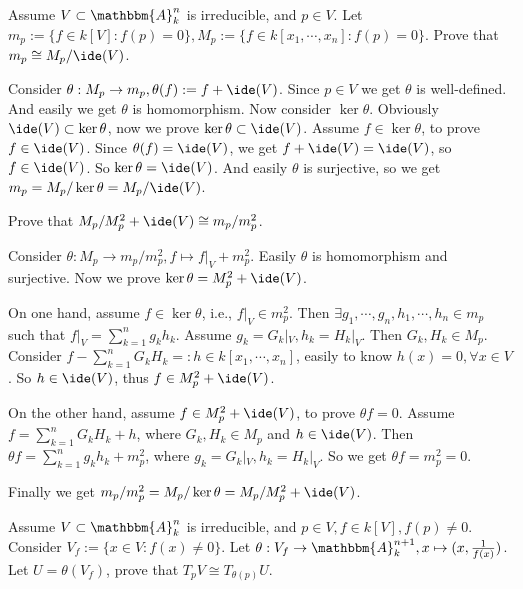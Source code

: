 \documentclass{ctexart}
\newif\ifpreface
\begin{document}
\large
\setlength{\baselineskip}{1.2em}
\ifpreface
  
  \newgeometry{left=2cm,right=2cm,top=2cm,bottom=2cm}
\else
  \maketitle
\fi
\begin{problem}
  Assume \(V \subset \mathbbm{A}_k^{n}\) is irreducible, and \(p \in V\).
  Let \(m_p := \{f \in k[V] : f(p) = 0\}, M_p := \{f \in k[x_1,\cdots,x_n]: f(p) = 0\}\).
  Prove that \(m_p \cong M_p/\ide(V)\).
\end{problem}
\begin{solution}
  Consider \( \theta : M_p \to m_p ,\theta(f) := f + \ide(V)\).
  Since \( p \in V\) we get \(\theta\) is well-defined.
  And easily we get \(\theta\) is homomorphism. Now consider \(\ker \theta\).
  Obviously \(\ide(V) \subset \ker \theta\), now we prove \(\ker \theta \subset \ide(V)\).
  Assume \( f \in \ker\theta\), to prove \(f \in \ide(V)\).
  Since \(\theta(f)=\ide(V)\), we get \(f+\ide(V)=\ide(V)\), so \(f \in \ide(V)\).
  So \(\ker \theta = \ide(V)\). And easily \(\theta\) is surjective, so we get
  \(m_p=M_p/\ker \theta=M_p / \ide(V)\).
\end{solution}
\begin{problem}
  Prove that \(M_p/M_p^2+\ide(V) \cong m_p/m_p^2\).
\end{problem}
\begin{solution}
  Consider \(\theta : M_p \to m_p/m_p^2, f \mapsto f|_V+m_p^2\). Easily \(\theta\) is homomorphism and surjective.
  Now we prove \(\ker \theta = M_p^2+\ide(V)\).

  On one hand, assume \(f \in \ker \theta\), i.e., \(f|_V \in m_p^2\).
  Then \(\exists g_1,\cdots,g_n,h_1,\cdots,h_n \in m_p\) such that \(f|_V=\sum_{k=1}^{n} g_k h_k\).
  Assume \(g_k=G_k|_V,h_k=H_k|_V\). Then \(G_k,H_k \in M_p\).
  Consider \(f-\sum_{k=1}^{n} G_k H_k=:h \in k[x_1,\cdots,x_n]\), easily to know \(h(x)=0,\forall x \in V\).
  So \(h \in \ide(V)\), thus \(f \in M_p^2+\ide(V)\).

  On the other hand, assume \(f \in M_p^2+\ide(V)\), to prove \(\theta f =0\).
  Assume \(f=\sum_{k=1}^{n} G_k H_k+h\), where \(G_k,H_k \in M_p\) and \(h \in \ide(V)\).
  Then \(\theta f = \sum_{k=1}^{n} g_k h_k +m_p^2\), where \(g_k=G_k|_V,h_k=H_k|_V\).
  So we get \(\theta f = m_p^2=0\).

  Finally we get \(m_p/m_p^2 = M_p/ \ker \theta = M_p / M_p^2+\ide(V)\).
\end{solution}
\begin{problem}
  Assume \(V \subset \mathbbm{A}_k^n\) is irreducible, and \(p \in V,f \in k[V], f(p)\neq 0\).
  Consider \(V_f:= \{x \in V: f(x)\neq 0 \}\). Let \(\theta: V_f \to \mathbbm{A}_k^{n+1},x \mapsto (x,\frac{1}{f(x)})\).
  Let \(U = \theta(V_f)\), prove that \(T_p V \cong T_{\theta(p)} U\).
\end{problem}
\end{document}
